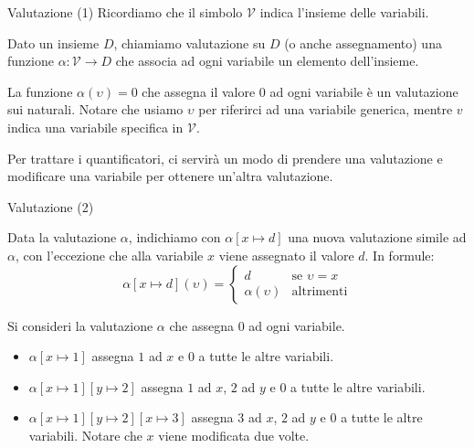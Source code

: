 \documentclass[aspectratio=169,10pt,dvipsnames,xcolor=table,handout]{beamer}
\newcommand{\mc}{\mathcal}
\begin{document}
\begin{frame}{Valutazione (1)}
    Ricordiamo che il simbolo $\mathcal V$ indica l'insieme delle variabili.
    \begin{definition}[Valutazione]
        Dato un insieme $D$, chiamiamo \alert{valutazione su $D$} (o anche \alert{assegnamento}) una funzione $\alpha : \mc V \to D$ che associa ad ogni variabile un elemento dell'insieme.
    \end{definition}

    \pause
    \begin{example}
        La funzione $\alpha(\upsilon) = 0$ che assegna il valore $0$ ad ogni variabile è un valutazione sui naturali. Notare che usiamo $\upsilon$ per riferirci ad una variabile generica, mentre $v$ indica una variabile specifica in $\mc V$.
    \end{example}

    \pause
    Per trattare i quantificatori, ci servirà un modo di prendere una valutazione e modificare una variabile per ottenere un'altra valutazione.
\end{frame}

\begin{frame}{Valutazione (2)}
    \begin{definition}
        Data la valutazione $\alpha$, indichiamo con $\alpha[x \mapsto d]$ una nuova valutazione simile ad $\alpha$, con l'eccezione che alla variabile $x$ viene assegnato il valore $d$. In formule:
        \[
            \alpha[x \mapsto d] (\upsilon) = \begin{cases}
                d                & \text{se $\upsilon = x$} \\
                \alpha(\upsilon) & \text{altrimenti}
            \end{cases}
        \]
    \end{definition}

    \begin{example}
        Si consideri la valutazione $\alpha$ che assegna $0$ ad ogni variabile.
        \begin{itemize}
            \item $\alpha[x \mapsto 1]$ assegna $1$ ad $x$ e $0$ a tutte le altre variabili.
            \item $\alpha[x \mapsto 1][y \mapsto 2]$ assegna $1$ ad $x$, $2$ ad $y$ e $0$ a tutte le altre variabili.
            \item $\alpha[x \mapsto 1][y \mapsto 2][x \mapsto 3]$ assegna $3$ ad $x$, $2$ ad $y$ e $0$ a tutte le altre variabili. Notare che $x$ viene modificata due volte.
        \end{itemize}
    \end{example}
\end{frame}
\end{document}
